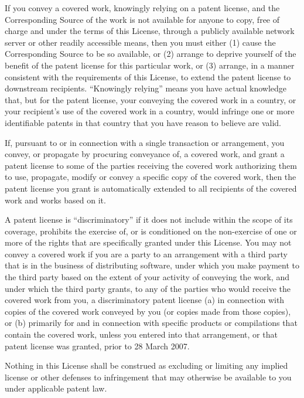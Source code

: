 \documentclass[letterpaper,12pt]{article}
\begin{document}
{If you convey a covered work, knowingly relying on a patent license, and the Corresponding Source of the work is not available for anyone to copy, free of charge and under the terms of this License, through a publicly available network server or other readily accessible means, then you must either (1) cause the Corresponding Source to be so available, or (2) arrange to deprive yourself of the benefit of the patent license for this particular work, or (3) arrange, in a manner consistent with the requirements of this License, to extend the patent license to downstream recipients. ``Knowingly relying'' means you have actual knowledge that, but for the patent license, your conveying the covered work in a country, or your recipient's use of the covered work in a country, would infringe one or more identifiable patents in that country that you have reason to believe are valid.

If, pursuant to or in connection with a single transaction or arrangement, you convey, or propagate by procuring conveyance of, a covered work, and grant a patent license to some of the parties receiving the covered work authorizing them to use, propagate, modify or convey a specific copy of the covered work, then the patent license you grant is automatically extended to all recipients of the covered work and works based on it.

A patent license is ``discriminatory'' if it does not include within the scope of its coverage, prohibits the exercise of, or is conditioned on the non-exercise of one or more of the rights that are specifically granted under this License. You may not convey a covered work if you are a party to an arrangement with a third party that is in the business of distributing software, under which you make payment to the third party based on the extent of your activity of conveying the work, and under which the third party grants, to any of the parties who would receive the covered work from you, a discriminatory patent license (a) in connection with copies of the covered work conveyed by you (or copies made from those copies), or (b) primarily for and in connection with specific products or compilations that contain the covered work, unless you entered into that arrangement, or that patent license was granted, prior to 28 March 2007.

Nothing in this License shall be construed as excluding or limiting any implied license or other defenses to infringement that may otherwise be available to you under applicable patent law.

}
\end{document}
